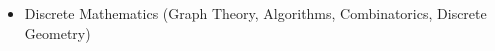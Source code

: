 \documentclass[10pt,a4]{article}
\begin{document}
\begin{small}
\begin{itemize}{}{}
\item Discrete Mathematics (Graph Theory, Algorithms, Combinatorics, Discrete Geometry)
\end{itemize}
%
%
%
%	

\end{small}
\end{document}
